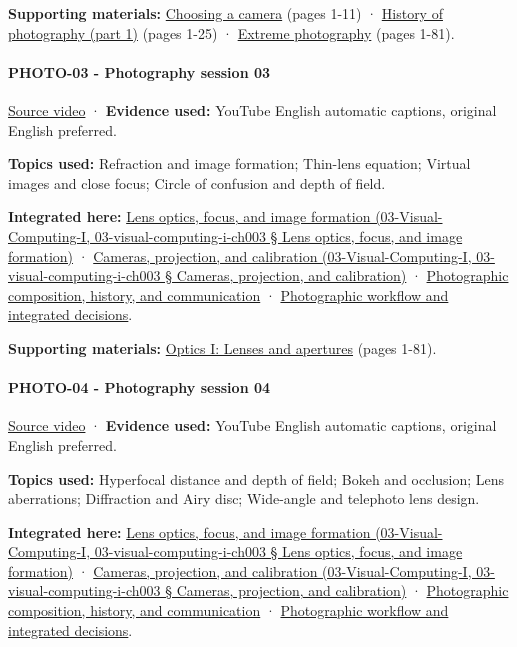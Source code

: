 \textbf{Supporting materials:} \href{https://drive.google.com/open?id=0B6w2XfPHEcZYQlF2U1VjRHRNLUE}{Choosing a camera} (pages 1-11) · \href{https://drive.google.com/open?id=0B6w2XfPHEcZYcm1nc0lRV0h4dzg}{History of photography (part 1)} (pages 1-25) · \href{https://drive.google.com/file/d/0B6w2XfPHEcZYVTZ5YzFzdXc3b0U/view?usp=sharing}{Extreme photography} (pages 1-81).

\paragraph{PHOTO-03 - Photography session 03}\label{photo-03---photography-session-03}

\href{https://www.youtube.com/watch?v=Q-hIFIHay9I}{Source video} · \textbf{Evidence used:} YouTube English automatic captions, original English preferred.

\textbf{Topics used:} Refraction and image formation; Thin-lens equation; Virtual images and close focus; Circle of confusion and depth of field.

\textbf{Integrated here:} \href{}{Lens optics, focus, and image formation (03-Visual-Computing-I, 03-visual-computing-i-ch003 § Lens optics, focus, and image formation)} · \href{}{Cameras, projection, and calibration (03-Visual-Computing-I, 03-visual-computing-i-ch003 § Cameras, projection, and calibration)} · \hyperref[04-visual-computing-ii-ch034]{Photographic composition, history, and communication} · \hyperref[04-visual-computing-ii-ch034]{Photographic workflow and integrated decisions}.

\textbf{Supporting materials:} \href{https://drive.google.com/file/d/0B6w2XfPHEcZYT0dwaFF4emd6Vzg/view?usp=sharing}{Optics I: Lenses and apertures} (pages 1-81).

\paragraph{PHOTO-04 - Photography session 04}\label{photo-04---photography-session-04}

\href{https://www.youtube.com/watch?v=Y6kwPir0uMM}{Source video} · \textbf{Evidence used:} YouTube English automatic captions, original English preferred.

\textbf{Topics used:} Hyperfocal distance and depth of field; Bokeh and occlusion; Lens aberrations; Diffraction and Airy disc; Wide-angle and telephoto lens design.

\textbf{Integrated here:} \href{}{Lens optics, focus, and image formation (03-Visual-Computing-I, 03-visual-computing-i-ch003 § Lens optics, focus, and image formation)} · \href{}{Cameras, projection, and calibration (03-Visual-Computing-I, 03-visual-computing-i-ch003 § Cameras, projection, and calibration)} · \hyperref[04-visual-computing-ii-ch034]{Photographic composition, history, and communication} · \hyperref[04-visual-computing-ii-ch034]{Photographic workflow and integrated decisions}.

